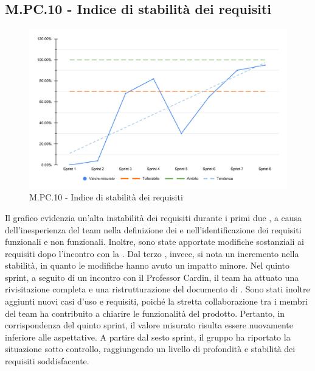 \subsection{M.PC.10 - Indice di stabilità dei requisiti}
\begin{figure}[H]
    \centering
    \includegraphics[width=\textwidth]{assets/stabilita_requisiti.pdf}
    \caption{M.PC.10 - Indice di stabilità dei requisiti}
\end{figure}

\par Il grafico evidenzia un’alta instabilità dei requisiti durante i primi due , a causa dell’inesperienza del team nella definizione dei  e nell’identificazione dei requisiti funzionali e non funzionali. Inoltre, sono state apportate modifiche sostanziali ai requisiti dopo l’incontro con la . Dal terzo , invece, si nota un incremento nella stabilità, in quanto le modifiche hanno avuto un impatto minore. Nel quinto sprint, a seguito di un incontro con il Professor Cardin, il team ha attuato una rivisitazione completa e una ristrutturazione del documento di \AdR. Sono stati inoltre aggiunti nuovi casi d’uso e requisiti, poiché la stretta collaborazione tra i membri del team ha contribuito a chiarire le funzionalità del prodotto. Pertanto, in corrispondenza del quinto sprint, il valore misurato risulta essere nuovamente inferiore alle aspettative. A partire dal sesto sprint, il gruppo ha riportato la situazione sotto controllo, raggiungendo un livello di profondità e stabilità dei requisiti soddisfacente.

